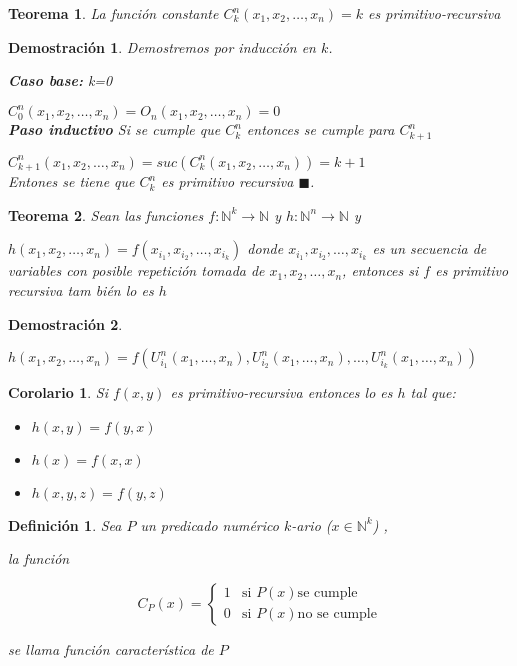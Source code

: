 \documentclass[a4paper,1pt]{report}
\newtheorem*{teo}{Teorema}
\newtheorem*{cor}{Corolario}
\newtheorem*{dem}{Demostración}
\newtheorem*{dfn}{Definición}
\begin{document}
\begin{teo}
La función constante $C^n_k(x_1,x_2,\dots,x_n)=k$ es primitivo-recursiva
\end{teo}

\begin{dem}
 Demostremos por inducción en $k$.
 
 \textbf{Caso base:} k=0
 
 $C^n_0(x_1,x_2,\dots,x_n)=O_n(x_1,x_2,\dots,x_n)=0$\\
 
 \textbf{Paso inductivo} Si se cumple que $C^n_k$ entonces se cumple para $C^n_{k+1}$
 
  $C^n_{k+1}(x_1,x_2,\dots,x_n)=suc(C^n_k(x_1,x_2,\dots,x_n))=k+1$\\

  Entones se tiene que $C_{k}^n$ es primitivo recursiva $\blacksquare$.
\end{dem}

\begin{teo}
 Sean las funciones $f:\mathbb{N}^k\rightarrow\mathbb{N}$ y $h:\mathbb{N}^n\rightarrow\mathbb{N}$ y
 
 $h(x_1,x_2,\dots,x_n)=f(x_{i_1},x_{i_2},\dots,x_{i_k})$ donde $x_{i_1},x_{i_2},\dots,x_{i_k}$ es un secuencia de variables con posible repetición tomada de $x_1,x_2,\dots,x_n$, entonces si $f$ es primitivo recursiva tam bién lo es $h$
\end{teo}

\begin{dem}


\end{dem}
 $h(x_1,x_2,\dots,x_n)=f(U^n_{i_1}(x_1,\dots,x_n),U^n_{i_2}(x_1,\dots,x_n),\dots,U^n_{i_k}(x_1,\dots,x_n))$
 
 \begin{cor}
  Si $f(x,y)$ es primitivo-recursiva entonces lo es $h$ tal que:
  \begin{itemize}
   \item $h(x,y)=f(y,x)$
   \item $h(x)=f(x,x)$
   \item $h(x,y,z) = f(y,z)$
  \end{itemize}

 \end{cor}
 
 \begin{dfn}
  Sea $P$ un predicado numérico $k$-ario ($x\in\mathbb{N}^k$) ,
  
  la función
  
  \begin{equation}
C_P(x) = 
\begin{cases}
1 & \text{si } P(x) \text{se cumple} \\
0   & \text{si } P(x) \text{no se cumple} 
\end{cases}
\end{equation}

se llama función característica de $P$
 \end{dfn}
 
\end{document}
